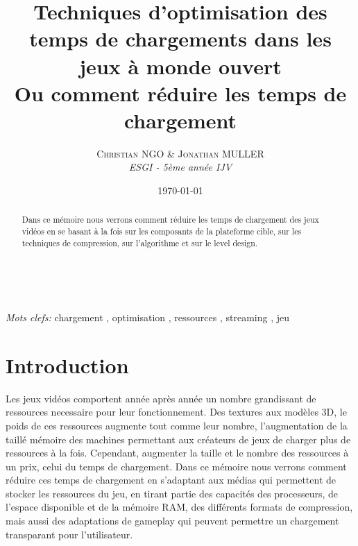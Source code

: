 \documentclass[a4paper, 11pt]{article} %
\title{\textbf{Techniques d'optimisation des temps de chargements dans les jeux à monde ouvert}\\ %
Ou comment réduire les temps de chargement} %
\author{\textsc{Christian NGO \& Jonathan MULLER} %
\\{\textit{ESGI - 5ème année IJV}}} %
\date{\today} %
\makeatletter
\renewcommand{\maketitle}{ %
\begin{flushright} %
{\LARGE\@title} %

\vspace{50pt} %

{\large\@author} %
\\\@date %

\vspace{40pt} %
\end{flushright}
}
\makeatother
\begin{document}
\maketitle %



\begin{abstract}
Dans ce mémoire nous verrons comment réduire les temps de chargement des jeux vidéos en se basant à la fois sur les composants de la plateforme cible, sur les techniques de compression, sur l'algorithme et sur le level design.
\end{abstract}

\hspace*{3,6mm}\textit{Mots clefs:} chargement , optimisation , ressources , streaming , jeu %

\vspace{30pt} %


\section*{Introduction}

Les jeux vidéos comportent année après année un nombre grandissant de ressources necessaire pour leur fonctionnement. Des textures aux modèles 3D, le poids de ces ressources augmente tout comme leur nombre, l'augmentation de la taillé mémoire des machines permettant aux créateurs de jeux de charger plus de ressources à la fois. Cependant, augmenter la taille et le nombre des ressources à un prix, celui du temps de chargement. Dans ce mémoire nous verrons comment réduire ces temps de chargement en s'adaptant aux médias qui permettent de stocker les ressources du jeu, en tirant partie des capacités des processeurs, de l'espace disponible et de la mémoire RAM, des différents formats de compression, mais aussi des adaptations de gameplay qui peuvent permettre un chargement transparant pour l'utilisateur.
\end{document}

